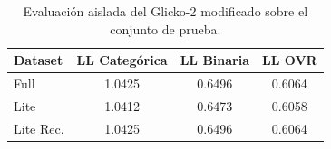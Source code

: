 \begin{table}[htbp]
    \centering
    \caption{Evaluaci\'on aislada del Glicko-2 modificado sobre el conjunto de prueba.}
    \label{tab:glicko_aislado}
    \begin{tabular}{lccc}
        \toprule
        \textbf{Dataset} & \textbf{LL Categ\'orica} & \textbf{LL Binaria} & \textbf{LL OVR} \\
        \midrule
        Full & 1.0425 & 0.6496 & 0.6064 \\
        Lite & 1.0412 & 0.6473 & 0.6058 \\
        Lite Rec. & 1.0425 & 0.6496 & 0.6064 \\
        \bottomrule
    \end{tabular}
\end{table}
